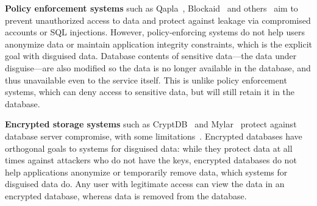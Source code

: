 \textbf{Policy enforcement systems} such as Qapla~\cite{qapla},
Blockaid~\cite{blockaid} and others~\cite{static, jeeves, jif, hails, ifdb,
oracle, multiverse, sieve} aim to prevent unauthorized access to data and
protect against leakage via compromised accounts or SQL injections. 
%
However, policy-enforcing systems do not help users anonymize data or maintain
application integrity constraints, which is the explicit goal with disguised
data.
%
Database contents of sensitive data---the data under disguise---are also
modified so the data is no longer available in the database, and thus
unavailable even to the service itself. This is unlike policy enforcement
systems, which can deny access to sensitive data, but will still retain it in
the database.
%

\textbf{Encrypted storage systems} such as CryptDB~\cite{cryptdb} and
Mylar~\cite{mylar} protect against database server compromise, with some
limitations~\cite{grubbs}.
%
%
%
Encrypted databases have orthogonal goals to systems for disguised data: while they protect data at all times
against attackers who do not have the keys, encrypted databases do not help applications
anonymize or temporarily remove data, which systems for disguised data do.
%
Any user with legitimate access can view the data in an encrypted database,
whereas \xxed data is removed from the database.

